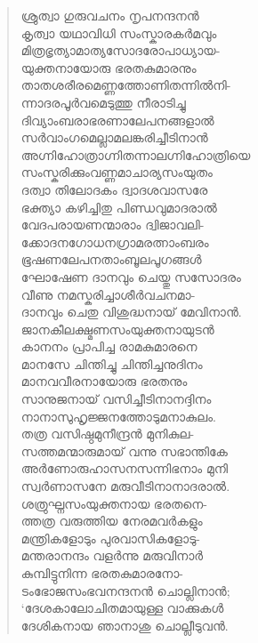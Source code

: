 \begin{verse}
ശ്രുത്വാ ഗുരുവചനം നൃപനന്ദനന്‍\\
കൃത്വാ യഥാവിധി സംസ്കാരകര്‍മവും\\
മിത്രഭൃത്യാമാത്യസോദരോപാധ്യായ-\\
യുക്തനായോരു ഭരതകുമാരനും\\
താതശരീരമെണ്ണത്തോണിതന്നില്‍നി-\\
ന്നാദരപൂര്‍വമെടുത്തു നീരാടിച്ചു\\
ദിവ്യാംബരാഭരണാലേപനങ്ങളാല്‍\\
സര്‍വാംഗമെല്ലാമലങ്കരിച്ചീടിനാന്‍\\
അഗ്നിഹോത്രാഗ്നിതന്നാലഗ്നിഹോത്രിയെ\\
സംസ്കരിക്കുംവണ്ണമാചാര്യസംയുതം\\
ദത്വാ തിലോദകം ദ്വാദശവാസരേ\\
ഭക്ത്യാ കഴിച്ചിതു പിണ്ഡവുമാദരാല്‍\\
വേദപരായണന്മാരാം ദ്വിജാവലി-\\
ക്കോദനഗോധനഗ്രാമരത്നാംബരം\\
ഭൂഷണലേപനതാംബൂലപൂഗങ്ങള്‍\\
ഘോഷേണ ദാനവും ചെയ്തു സസോദരം\\
വീണു നമസ്കരിച്ചാശീര്‍വചനമാ-\\
ദാനവും ചെതു വിശുദ്ധനായ് മേവിനാന്‍.\\
ജാനകീലക്ഷ്മണസംയുക്തനായുടന്‍\\
കാനനം പ്രാപിച്ച രാമകുമാരനെ\\
മാനസേ ചിന്തിച്ചു ചിന്തിച്ചനുദിനം\\
മാനവവീരനായോരു ഭരതനും\\
സാനുജനായ് വസിച്ചീടിനാനദ്ദിനം\\
നാനാസുഹൃജ്ജനത്തോടുമനാകുലം.\\
തത്ര വസിഷ്ഠമുനീന്ദ്രന്‍ മുനികുല-\\
സത്തമന്മാരുമായ് വന്നു സഭാന്തികേ\\
അര്‍ണോരുഹാസനസന്നിഭനാം മുനി\\
സ്വര്‍ണാസനേ മരുവീടിനാനാദരാല്‍.\\
ശത്രുഘ്നസംയുക്തനായ ഭരതനെ-\\
ത്തത്ര വരുത്തിയ നേരമവര്‍കളും\\
മന്ത്രികളോടും പുരവാസികളോടു-\\
മന്തരാനന്ദം വളര്‍ന്നു മരുവിനാര്‍\\
കുമ്പിട്ടുനിന്ന ഭരതകുമാരനോ-\\
ടംഭോജസംഭവനന്ദനന്‍ ചൊല്ലിനാന്‍;\\
‘ദേശകാലോചിതമായുള്ള വാക്കുകള്‍\\
ദേശികനായ ഞാനാശു ചൊല്ലീടുവന്‍.\\

\end{verse}
